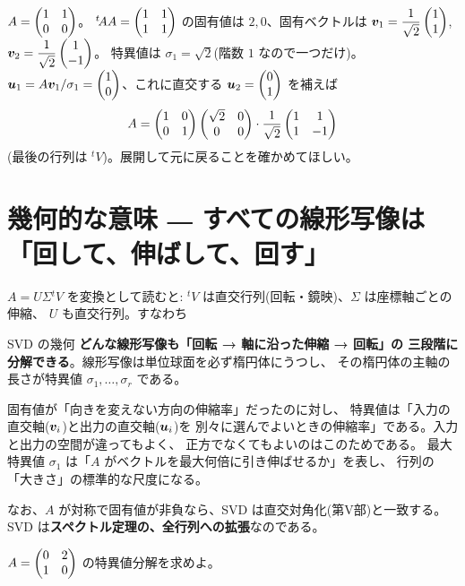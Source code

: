 \begin{rei}\label{rei:svd-first}
$A = \begin{pmatrix}1 & 1 \\ 0 & 0\end{pmatrix}$。
${}^t\!AA = \begin{pmatrix}1 & 1 \\ 1 & 1\end{pmatrix}$ の固有値は $2, 0$、固有ベクトルは
$\bm{v}_1 = \dfrac{1}{\sqrt{2}}\begin{pmatrix}1 \\ 1\end{pmatrix}$,
$\bm{v}_2 = \dfrac{1}{\sqrt{2}}\begin{pmatrix}1 \\ -1\end{pmatrix}$。
特異値は $\sigma_1 = \sqrt{2}$(階数 $1$ なので一つだけ)。
$\bm{u}_1 = A\bm{v}_1/\sigma_1 = \begin{pmatrix}1 \\ 0\end{pmatrix}$、これに直交する
$\bm{u}_2 = \begin{pmatrix}0 \\ 1\end{pmatrix}$ を補えば
\[
A = \begin{pmatrix}1 & 0 \\ 0 & 1\end{pmatrix}\begin{pmatrix}\sqrt{2} & 0 \\ 0 & 0\end{pmatrix}
\cdot \frac{1}{\sqrt{2}}\begin{pmatrix}1 & 1 \\ 1 & -1\end{pmatrix}
\]
(最後の行列は ${}^tV$)。展開して元に戻ることを確かめてほしい。
\end{rei}

\section{幾何的な意味 ― すべての線形写像は「回して、伸ばして、回す」}

$A = U\Sigma{}^tV$ を変換として読むと:
${}^tV$ は直交行列(回転・鏡映)、$\Sigma$ は座標軸ごとの伸縮、
$U$ も直交行列。すなわち

\begin{itembox}[l]{SVD の幾何}
\textbf{どんな線形写像も「回転 → 軸に沿った伸縮 → 回転」の
三段階に分解できる}。線形写像は単位球面を必ず楕円体にうつし、
その楕円体の主軸の長さが特異値 $\sigma_1, \dots, \sigma_r$ である。
\end{itembox}

固有値が「向きを変えない方向の伸縮率」だったのに対し、
特異値は「入力の直交軸($\bm{v}_i$)と出力の直交軸($\bm{u}_i$)を
別々に選んでよいときの伸縮率」である。入力と出力の空間が違ってもよく、
正方でなくてもよいのはこのためである。
最大特異値 $\sigma_1$ は「$A$ がベクトルを最大何倍に引き伸ばせるか」を表し、
行列の「大きさ」の標準的な尺度になる。

なお、$A$ が対称で固有値が非負なら、SVD は直交対角化(第V部)と一致する。
SVD は\textbf{スペクトル定理の、全行列への拡張}なのである。

\begin{mondai}\label{q:svd}
$A = \begin{pmatrix}0 & 2 \\ 1 & 0\end{pmatrix}$ の特異値分解を求めよ。
\end{mondai}

